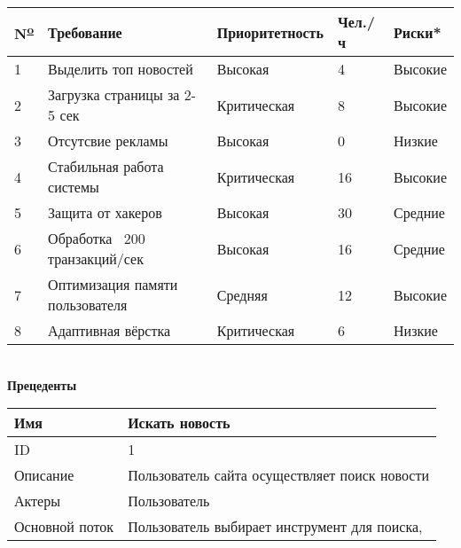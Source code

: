 \begin{center}
    \small
    \begin{tabular}{|l|l|l|l|l|}
        \hline
        N\textsuperscript{\underline{o}} & Требование                      & Приоритетность & Чел./ч & Риски*  \\
        \hline
        1                                & Выделить топ новостей           & Высокая        & 4      & Высокие \\
        \hline
        2                                & Загрузка страницы за 2-5 сек    & Критическая    & 8      & Высокие \\
        \hline
        3                                & Отсутсвие рекламы               & Высокая        & 0      & Низкие  \\
        \hline
        4                                & Стабильная работа системы       & Критическая    & 16     & Высокие \\
        \hline
        5                                & Защита от хакеров               & Высокая        & 30     & Средние \\
        \hline
        6                                & Обработка ~200 транзакций/сек   & Высокая        & 16     & Средние \\
        \hline
        7                                & Оптимизация памяти пользователя & Средняя        & 12     & Высокие \\
        \hline
        8                                & Адаптивная вёрстка              & Критическая    & 6      & Низкие  \\
        \hline
    \end{tabular}\\
    \vspace{1cm}
    \large
    \textbf{Прецеденты\\}
    \small
    \begin{tabular}{|l|l|}
        \hline
        Имя                   & Искать новость                                \\
        \hline
        ID                    & 1                                             \\
        \hline
        Описание              & Пользователь сайта осуществляет поиск новости \\
        \hline
        Актеры                & Пользователь                                  \\
        \hline
        Основной поток        & Пользователь выбирает инструмент для поиска,  \\

\end{tabular}
\end{center}
